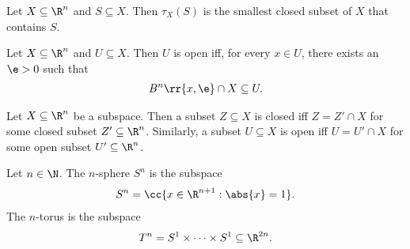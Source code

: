 \documentclass{article}
\begin{document}
\begin{theorem}
  \label{thm:closure-smallest-subset}
  Let $X\subseteq\R^n$ and $S\subseteq X$. Then $\tau_X(S)$ is the smallest closed subset
  of $X$ that contains $S$.
\end{theorem}

\begin{theorem}
  \label{thm:open-epsillon}
  Let $X\subseteq\R^n$ and $U\subseteq X$. Then $U$ is open iff, for every $x\in U$, there
  exists an $\e>0$ such that \begin{align*}
    B^n \rr{ x, \e } \cap X \subseteq U.
  \end{align*}
\end{theorem}

\begin{theorem}
  Let $X\subseteq\R^n$ be a subspace. Then a subset $Z\subseteq X$ is closed iff $Z=Z'\cap X$
  for some closed subset $Z'\subseteq \R^n$. Similarly, a subset $U\subseteq X$ is open iff
  $U=U'\cap X$ for some open subset $U'\subseteq\R^n$.
\end{theorem}

\begin{definition}
  \label{def:nsphere}
  Let $n\in\N$. The $n$-sphere $S^n$ is the subspace
  \begin{align*}
    S^n = \cc{ x \in \R^{n+1} : \abs{ x } = 1 }.
  \end{align*}
  The $n$-torus is the subspace
  \begin{align*}
    T^n = S^1 \times \cdots \times S^1 \subseteq \R^{2n}.
  \end{align*}
\end{definition}
\end{document}

